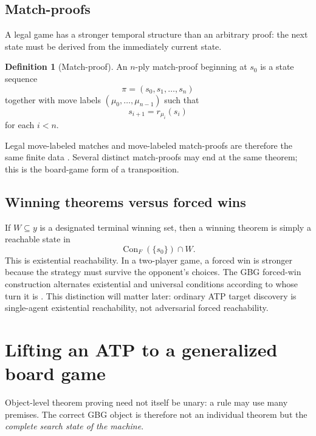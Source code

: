 \documentclass[11pt]{article}
\theoremstyle{definition}
\newtheorem{definition}[theorem]{Definition}
\newcommand{\Con}{\operatorname{Con}}
\begin{document}
\subsection{Match-proofs}

A legal game has a stronger temporal structure than an arbitrary proof: the next state must be derived from the immediately current state.

\begin{definition}[Match-proof]
An $n$-ply match-proof beginning at $s_0$ is a state sequence
\[
\pi=(s_0,s_1,\ldots,s_n)
\]
together with move labels $(\mu_0,\ldots,\mu_{n-1})$ such that
\[
 s_{i+1}=r_{\mu_i}(s_i)
\]
for each $i<n$.
\end{definition}

Legal move-labeled matches and move-labeled match-proofs are therefore the same finite data \cite{TennesonGBG20}. Several distinct match-proofs may end at the same theorem; this is the board-game form of a transposition.

\subsection{Winning theorems versus forced wins}

If $W\subseteq y$ is a designated terminal winning set, then a winning theorem is simply a reachable state in
\[
\Con_F(\{s_0\})\cap W.
\]
This is existential reachability. In a two-player game, a forced win is stronger because the strategy must survive the opponent's choices. The GBG forced-win construction alternates existential and universal conditions according to whose turn it is \cite{TennesonGBG20}. This distinction will matter later: ordinary ATP target discovery is single-agent existential reachability, not adversarial forced reachability.

\section{Lifting an ATP to a generalized board game}

Object-level theorem proving need not itself be unary: a rule may use many premises. The correct GBG object is therefore not an individual theorem but the \emph{complete search state of the machine}.
\end{document}
